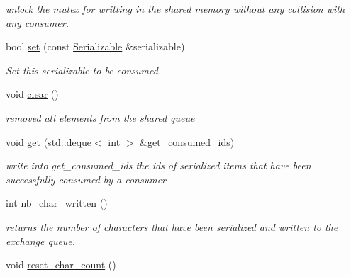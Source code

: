 \begin{DoxyCompactItemize}
\begin{DoxyCompactList}\small\item\em unlock the mutex for writting in the shared memory without any collision with any consumer. \end{DoxyCompactList}\item 
bool \hyperlink{classshared__memory_1_1Exchange__manager__producer_a0f86798dbbb5bead856c566257bd1b07}{set} (const \hyperlink{classSerializable}{Serializable} \&serializable)
\begin{DoxyCompactList}\small\item\em Set this serializable to be consumed. \end{DoxyCompactList}\item 
void \hyperlink{classshared__memory_1_1Exchange__manager__producer_a733c4c3f794e10590569f94e3f320201}{clear} ()
\begin{DoxyCompactList}\small\item\em removed all elements from the shared queue \end{DoxyCompactList}\item 
\mbox{\label{classshared__memory_1_1Exchange__manager__producer_afd8afb25d70407b785484e68d1182c0b}} 
void \hyperlink{classshared__memory_1_1Exchange__manager__producer_afd8afb25d70407b785484e68d1182c0b}{get} (std\+::deque$<$ int $>$ \&get\+\_\+consumed\+\_\+ids)
\begin{DoxyCompactList}\small\item\em write into get\+\_\+consumed\+\_\+ids the ids of serialized items that have been successfully consumed by a consumer \end{DoxyCompactList}\item 
int \hyperlink{classshared__memory_1_1Exchange__manager__producer_ab31e6b87ad4c856736dec15486ed4489}{nb\+\_\+char\+\_\+written} ()
\begin{DoxyCompactList}\small\item\em returns the number of characters that have been serialized and written to the exchange queue. \end{DoxyCompactList}\item 
\mbox{\label{classshared__memory_1_1Exchange__manager__producer_a742e8859608d49901d3dafbbe08e4674}} 
void \hyperlink{classshared__memory_1_1Exchange__manager__producer_a742e8859608d49901d3dafbbe08e4674}{reset\+\_\+char\+\_\+count} ()

\end{DoxyCompactItemize}
